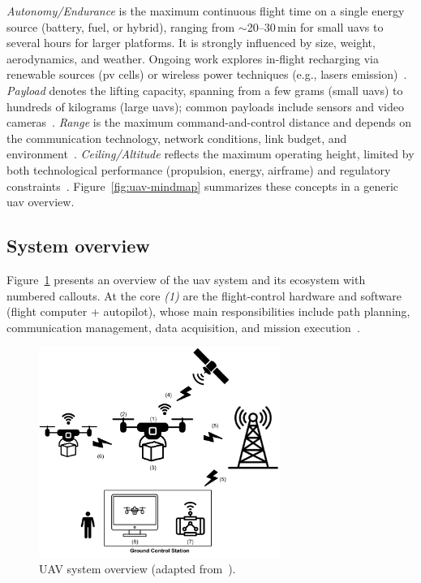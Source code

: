 \emph{Autonomy/Endurance} is the maximum continuous flight time on a single
energy source (battery, fuel, or hybrid), ranging from \(\sim\)20–30\,min for
small \glspl{uav} to several hours for larger platforms. It is strongly
influenced by size, weight, aerodynamics, and weather.
Ongoing work explores in-flight recharging via renewable sources (\gls{pv}
cells) or wireless power techniques (e.g., lasers emission)~\cite{mohsan2022towards,mohsan_comprehensive_2022}.
\emph{Payload} denotes the lifting capacity, spanning from a few grams (small
\glspl{uav}) to hundreds of kilograms (large \glspl{uav}); common payloads
include sensors and video cameras~\cite{mohsan2022towards}.
\emph{Range} is the maximum command-and-control distance and depends on the
communication technology, network conditions, link budget, and
environment~\cite{mohsan2022towards}.
\emph{Ceiling/Altitude} reflects the maximum operating height, limited by both technological performance (propulsion, energy, airframe) and regulatory constraints~\cite{mohsan2022towards}.
Figure~\ref{fig:uav-mindmap} summarizes these concepts in a generic \gls{uav}
overview.

%
\subsection{System overview}%
\label{sec:system-overview}

Figure~\ref{fig:uav-sysOverv} presents an overview of the \gls{uav} system and its ecosystem with numbered callouts. 
At the core \emph{(1)} are the flight-control hardware and software (flight computer + autopilot), whose main responsibilities include 
path planning, communication management, data acquisition, and mission execution~\cite{aggarwal2020UAVPathPlanning}.

\begin{figure}[!hbt]
  \centering
  \includegraphics[width=0.7\textwidth]{./img/pdf/uav-sys-overv.pdf}
  \caption[UAV system overview]{UAV system overview (adapted from~\cite{mohsan2022towards,aggarwal2020UAVPathPlanning}).}
  \label{fig:uav-sysOverv}
\end{figure}

